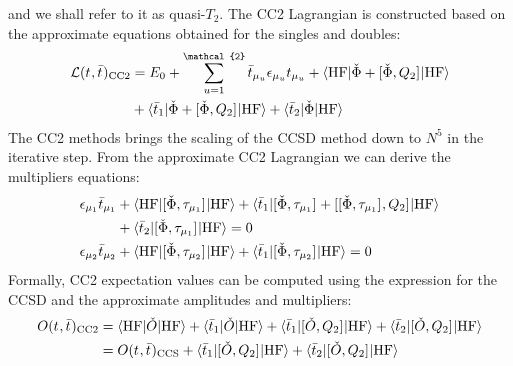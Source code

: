 and we shall refer to it as quasi-$T_2$.
The \acrshort*{CC2} Lagrangian is constructed based on the approximate
equations obtained for the singles and
doubles:\autocite{Christiansen1995-vy, Helgaker2000-tz}
\begin{equation}\label{eq:cc2-lagrangian}
  \begin{aligned}
  \mathcal{L}(\tamp{}, \tbar{})_\mathrm{CC2}
  &=
  E_0
  + \sum_{u=1}^{\mathcal{2}}\tbar{\mu_u}\denom{\mu_u}\tamp{\mu_u}
  + \braket{\mathrm{HF} | \check{\Phi} + \commutator{\check{\Phi}}{Q_2} | \mathrm{HF}} \\
  &+ \braket{\tbar{1} |
  \check{\Phi} + \commutator{\check{\Phi}}{Q_2}
  | \mathrm{HF}}
  + \braket{\tbar{2} | \check{\Phi} | \mathrm{HF}}
  \end{aligned}
\end{equation}
The \acrshort*{CC2} methods brings the scaling of the \acrshort*{CCSD}
method down to $N^5$ in the iterative step.
From the approximate \acrshort*{CC2} Lagrangian we can derive the
multipliers equations:
\begin{subequations}\label{eq:cc2-multipliers}
  \begin{align}
    \epsilon_{\mu_1}\bar{t}_{\mu_1} &+
     \braket{\mathrm{HF} | [ \check{\Phi}, \tau_{\mu_1} ]^{} | \mathrm{HF}}
   + \braket{\bar{t}_{1} |
       [ \check{\Phi}, \tau_{\mu_1} ]^{}
     + [ [ \check{\Phi}, \tau_{\mu_1} ]^{}, Q_2 ]^{}
     | \mathrm{HF}} \nonumber \\
   &+ \braket{\bar{t}_{2} | [ \check{\Phi}, \tau_{\mu_1} ]^{} |
   \mathrm{HF}} = 0 \label{eq:cc2-singles-multipliers} \\
    \epsilon_{\mu_2}\bar{t}_{\mu_2} &+
    \braket{\mathrm{HF} | [ \check{\Phi}, \tau_{\mu_2} ]^{} | \mathrm{HF}}
   + \braket{\bar{t}_{1} |
       [ \check{\Phi}, \tau_{\mu_2} ]^{}
     | \mathrm{HF}}
     = 0 \label{eq:cc2-doubles-multipliers}
  \end{align}
\end{subequations}
Formally, \acrshort*{CC2} expectation values can be computed using the expression for
the \acrshort*{CCSD} and the approximate amplitudes and multipliers:
\begin{equation}\label{eq:cc2-expectation-value}
  \begin{aligned}
  O(t_{}, \bar{t}_{})_\mathrm{CC2}
  &=
  \braket{\mathrm{HF} | \check{O} | \mathrm{HF} }
  + \braket{\bar{t}_{1} | \check{O} | \mathrm{HF} }
  + \braket{\bar{t}_{1} | [ \check{O}, Q_2 ]^{} | \mathrm{HF} }
  + \braket{\bar{t}_{2} | [ \check{O}, Q_2 ]^{} | \mathrm{HF} } \\
  &=
  O(t_{}, \bar{t}_{})_\mathrm{CCS}
  + \braket{\bar{t}_{1} | [ \check{O}, Q_2 ]^{} | \mathrm{HF} }
  + \braket{\bar{t}_{2} | [ \check{O}, Q_2 ]^{} | \mathrm{HF} }
  \end{aligned}
\end{equation}

